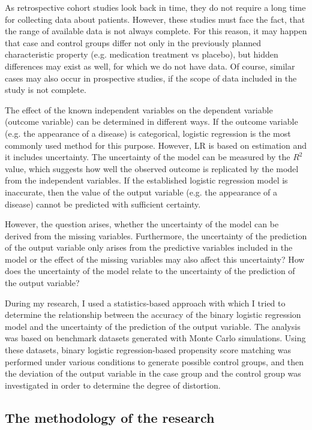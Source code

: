 		As retrospective cohort studies look back in time, they do not require a long time for collecting data about patients. However, these studies must face the fact, that the range of available data is not always complete. For this reason, it may happen that case and control groups differ not only in the previously planned characteristic property (e.g. medication treatment vs placebo), but hidden differences may exist as well, for which we do not have data. Of course, similar cases may also occur in prospective studies, if the scope of data included in the study is not complete.
								
		The effect of the known independent variables on the dependent variable (outcome variable) can be determined in different ways. If the outcome variable (e.g. the appearance of a disease) is categorical, logistic regression is the most commonly used method for this purpose. However, LR is based on estimation and it includes uncertainty. The uncertainty of the model can be measured by the $R^2$ value, which suggests how well the observed outcome is replicated by the model from the independent variables. If the established logistic regression model is inaccurate, then the value of the output variable (e.g. the appearance of a disease) cannot be predicted with sufficient certainty.
								
		However, the question arises, whether the uncertainty of the model can be derived from the missing variables. Furthermore, the uncertainty of the prediction of the output variable only arises from the predictive variables included in the model or the effect of the missing variables may also affect this uncertainty? How does the uncertainty of the model relate to the uncertainty of the prediction of the output variable?
								
		During my research, I used a statistics-based approach with which I tried to determine the relationship between the accuracy of the binary logistic regression model and the uncertainty of the prediction of the output variable. The analysis was based on benchmark datasets generated with Monte Carlo simulations. Using these datasets, binary logistic regression-based propensity score matching was performed under various conditions to generate possible control groups, and then the deviation of the output variable in the case group and the control group was investigated in order to determine the degree of distortion. %
								
		\subsection{The methodology of the research}
								
